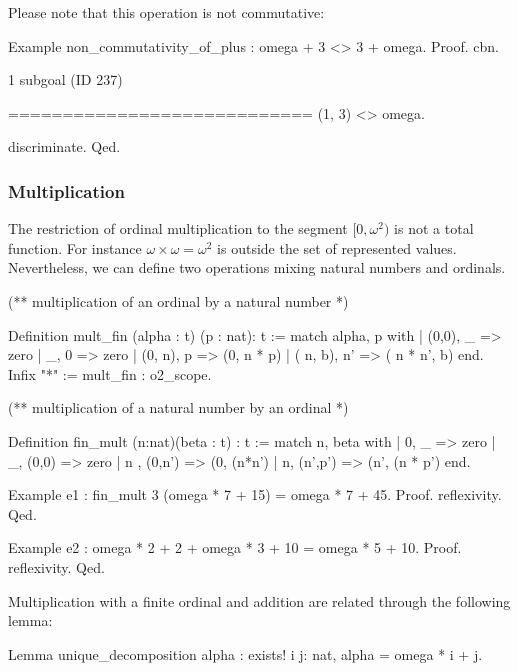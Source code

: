\documentclass[a4paper]{book}
\begin{document}
Please note that this operation is not commutative:

\begin{Coqsrc}
Example non_commutativity_of_plus :  omega + 3 <> 3 + omega.
Proof.
  cbn.
\end{Coqsrc}

\begin{Coqanswer}
1 subgoal (ID 237)
  
  ============================
(1, 3) <> omega.
\end{Coqanswer}

\begin{Coqsrc}
 discriminate.
Qed.
\end{Coqsrc}


\subsubsection{Multiplication}

The restriction of ordinal multiplication to the segment $[0,\omega^2)$ is not a total function.
For instance $\omega\times\omega= \omega^2$ is outside the set of represented values.
Nevertheless, we can define two operations mixing natural numbers and ordinals.

\begin{Coqsrc}
(** multiplication of an ordinal by a natural number *)

Definition mult_fin  (alpha : t) (p : nat): t :=
  match alpha, p with
 |  (0,0), _  => zero
 |  _, 0 => zero
 |  (0, n), p => (0, n * p)
 |  ( n, b),  n' => ( n *  n', b)
               end.
Infix "*" := mult_fin : o2_scope.

(** multiplication of  a natural number by an ordinal *)

Definition fin_mult (n:nat)(beta : t) : t :=
  match n, beta with
 |  0, _  => zero
 |  _, (0,0) => zero
 |   n , (0,n') => (0, (n*n')%
 |  n, (n',p') => (n', (n * p')%
 end.

Example e1 : fin_mult 3 (omega * 7 + 15) = omega * 7 + 45.
Proof. reflexivity. Qed.

Example e2 :  omega * 2 + 2 + omega * 3 + 10 = omega * 5 + 10.
Proof. reflexivity. Qed.
\end{Coqsrc}

Multiplication with a finite ordinal and addition are related through the following lemma:

\begin{Coqsrc}
Lemma unique_decomposition alpha : 
    exists! i j: nat,  alpha = omega * i + j.
\end{Coqsrc}
\end{document}
